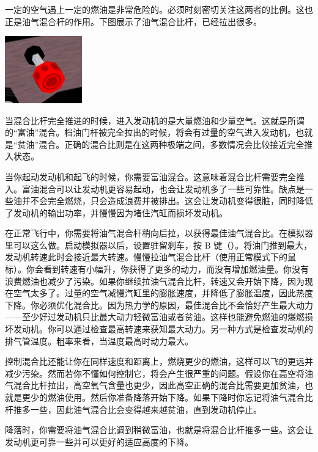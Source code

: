 一定的空气遇上一定的燃油是非常危险的。必须时刻密切关注这两者的比例。这也正是油气混合杆的作用。下图展示了油气混合比杆，已经拉出很多。

\begin{center}
\includegraphics[width=0.25\textwidth]{img/tut_30}
\end{center}
\fi

当混合比杆完全推进的时候，进入发动机的是大量燃油和少量空气。这就是所谓的“富油”混合。档油门杆被完全拉出的时候，将会有过量的空气进入发动机，也就是“贫油”混合。正确的混合比则是在这两种极端之间，多数情况会比较接近完全推入状态。

当你起动发动机和起飞的时候，你需要富油混合。这意味着混合比杆需要完全推入。富油混合可以让发动机更容易起动，也会让发动机多了一些可靠性。缺点是一些油并不会完全燃烧，只会造成浪费并被排出。这会让发动机变得很脏，同时降低了发动机的输出功率，并慢慢因为堵住汽缸而损坏发动机。

在正常飞行中，你需要将油气混合杆稍向后拉，以获得最佳油气混合比。在模拟器里可以这么做。启动模拟器以后，设置驻留刹车，按 B 键（）。将油门推到最大，发动机转速此时会接近最大转速。慢慢拉油气混合比杆（使用正常模式下的鼠标）。你会看到转速有小幅升，你获得了更多的动力，而没有增加燃油量。你没有浪费燃油也减少了污染。如果你继续拉油气混合比杆，转速又会开始下降，因为现在空气太多了。过量的空气减慢汽缸里的膨胀速度，并降低了膨胀温度，因此热度下降。你必须优化混合比。因为热力学的原因，最佳混合比不会恰好产生最大动力——至少好过发动机只比最大动力轻微富油或者贫油。这样也能避免燃油的爆燃损坏发动机。你可以通过检查最高转速来获知最大动力。另一种方式是检查发动机的排气管温度。粗率来看，当温度最高时动力最大。

控制混合比还能让你在同样速度和距离上，燃烧更少的燃油，这样可以飞的更远并减少污染。然而若你不懂如何控制它，将会产生很严重的问题。假设你在高空将油气混合比杆拉出，高空氧气含量也更少，因此高空正确的混合比需要更加贫油，也就是更少的燃油使用。然后你准备降落开始下降。如果下降时你忘记将油气混合比杆推多一些，因此油气混合比会变得越来越贫油，直到发动机停止。

降落时，你需要将油气混合比调到稍微富油，也就是将混合比杆推多一些。这会让发动机更可靠一些并可以更好的适应高度的下降。

